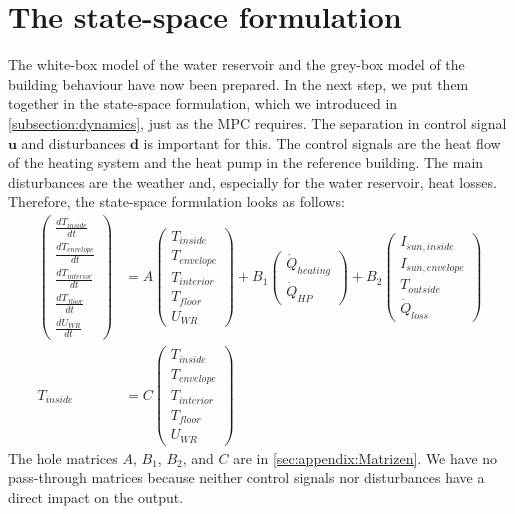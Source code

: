     \section{The state-space formulation}
    \label{holeModel}
    The white-box model of the water reservoir and the grey-box model of the building behaviour have now been prepared. In the next step, we put them together in the state-space formulation, which we introduced in \autoref{subsection:dynamics}, just as the MPC requires.\newline
    The separation in control signal $\textbf{u}$ and disturbances $\textbf{d}$ is important for this. The control signals are the heat flow of the heating system and the heat pump in the reference building. The main disturbances are the weather and, especially for the water reservoir, heat losses. Therefore, the state-space formulation looks as follows: 
  \begin{align}
	    \label{eq:ZRD Modell}
	 \left(\begin{array}{c} \frac{d T_{inside}}{d t} \\ \frac{d T_{envelope}}{d t} \\ \frac{d T_{interior}}{d t}\\ \frac{d T_{floor}}{d t}\\ \frac{d U_{WR}}{d t} \end{array}\right) &= A \left(\begin{array}{c} T_{inside} \\ T_{envelope} \\ T_{interior}\\ T_{floor}\\ U_{WR} \end{array}\right) + B_\text{1} \left(\begin{array}{c} \dot{Q}_{heating} \\ \dot{Q}_{HP} \end{array}\right) + B_\text{2} \left(\begin{array}{c} I_{sun,inside}\\ I_{sun,envelope}\\ T_{outside} \\ \dot{Q}_{loss} \end{array}\right) \\
	 T_{inside} &= C \left(\begin{array}{c} T_{inside} \\ T_{envelope} \\ T_{interior}\\ T_{floor}\\ U_{WR} \end{array}\right) \nonumber
	\end{align}	
    The hole matrices $A$, $B_\text{1}$, $B_\text{2}$, and $C$ are in \autoref{sec:appendix:Matrizen}. We have no pass-through matrices because neither control signals nor disturbances have a direct impact on the output. 
     
